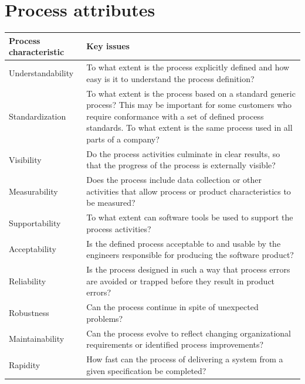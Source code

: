 \section{Process attributes}
\begin{table}[h!]
\centering
\begin{tabular}{ |p{3cm}|p{8cm}|  }
\hline
Process characteristic & Key issues \\
\hline
\hline
Understandability & To what extent is the process explicitly defined and how easy is it to understand the process definition?\\
\hline
Standardization & To what extent is the process based on a standard generic process? This may be important for some customers who require conformance with a set of defined process standards. To what extent is the same process used in all parts of a company?\\
\hline
Visibility & Do the process activities culminate in clear results, so that the progress of the process is externally visible?\\
\hline
Measurability & Does the process include data collection or other activities that allow process or product characteristics to be measured?\\
\hline
Supportability & To what extent can software tools be used to support the process activities?\\
\hline
Acceptability & Is the defined process acceptable to and usable by the engineers responsible for producing the software product?\\
\hline
Reliability & Is the process designed in such a way that process errors are avoided or trapped before they result in product errors?\\
\hline
Robustness & Can the process continue in spite of unexpected problems?\\
\hline
Maintainability & Can the process evolve to reflect changing organizational requirements or identified process improvements?\\
\hline
Rapidity & How fast can the process of delivering a system from a given specification be completed?\\
\hline
\end{tabular}

\label{table:T6_2}
\end{table}


